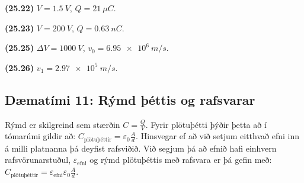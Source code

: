 \begin{tcolorbox}
\begin{enumerate*}[label = \vspace{0.15cm} ]
  \item \textbf{(25.22)} $V = \SI{1.5}{V}$, $Q = \SI{21}{\mu C}$.
  \item \textbf{(25.23)} $V = \SI{200}{V}$, $Q = \SI{0.63}{nC}$.
  \item \textbf{(25.25)} $\Delta V = \SI{1000}{V}$, $v_0 = \SI{6.95e6}{m/s}$.
  \item \textbf{(25.26)} $v_1 = \SI{2.97e5}{m/s}$.
\end{enumerate*}
\end{tcolorbox}

\newpage

\subsection*{Dæmatími 11: Rýmd þéttis og rafsvarar}


\begin{tcolorbox}
Rýmd er skilgreind sem stærðin $C = \frac{Q}{V}$. Fyrir plötuþétti þýðir þetta að í tómarúmi gildir að: $C_{\text{plötuþéttir}} = \varepsilon_0 \frac{A}{d}$. Hinsvegar ef að við setjum eitthvað efni inn á milli platnanna þá deyfist rafsviðið. Við segjum þá að efnið hafi einhvern rafsvörunarstuðul, $\varepsilon_{\text{efni}}$ og rýmd plötuþéttis með rafsvara er þá gefin með: $C_{\text{plötuþéttir}} = \varepsilon_{\text{efni}} \varepsilon_0 \frac{A}{d}$.
\end{tcolorbox}

